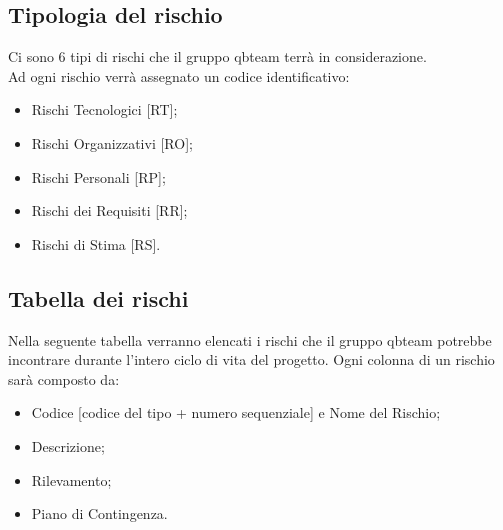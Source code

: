 \subsection{Tipologia del rischio}
Ci sono 6 tipi di rischi che il gruppo qbteam terrà in considerazione. 
\\Ad ogni rischio verrà assegnato un codice identificativo:
\begin{itemize}
	\item Rischi Tecnologici [RT];
	\item Rischi Organizzativi [RO];
	\item Rischi Personali [RP];
	\item Rischi dei Requisiti [RR];
	\item Rischi di Stima [RS].
\end{itemize}

\subsection{Tabella dei rischi}
Nella seguente tabella verranno elencati i rischi che il gruppo qbteam potrebbe incontrare durante l'intero ciclo di vita del progetto.
Ogni colonna di un rischio sarà composto da:
\begin{itemize}
	\item Codice [codice del tipo + numero sequenziale] e Nome del Rischio;
	\item Descrizione;
	\item Rilevamento;
	\item Piano di Contingenza.
\end{itemize}


